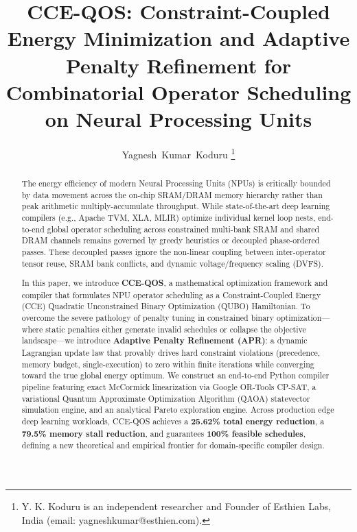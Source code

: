 \documentclass[journal]{IEEEtran}
\theoremstyle{definition}
\begin{document}
\title{CCE-QOS: Constraint-Coupled Energy Minimization and Adaptive Penalty Refinement for Combinatorial Operator Scheduling on Neural Processing Units}

\author{Yagnesh~Kumar~Koduru%
\thanks{Y. K. Koduru is an independent researcher and Founder of Esthien Labs, India (email: yagneshkumar@esthien.com).}}

\maketitle

\begin{abstract}
The energy efficiency of modern Neural Processing Units (NPUs) is critically bounded by data movement across the on-chip SRAM/DRAM memory hierarchy rather than peak arithmetic multiply-accumulate throughput. While state-of-the-art deep learning compilers (e.g., Apache TVM, XLA, MLIR) optimize individual kernel loop nests, end-to-end global operator scheduling across constrained multi-bank SRAM and shared DRAM channels remains governed by greedy heuristics or decoupled phase-ordered passes. These decoupled passes ignore the non-linear coupling between inter-operator tensor reuse, SRAM bank conflicts, and dynamic voltage/frequency scaling (DVFS).

In this paper, we introduce \textbf{CCE-QOS}, a mathematical optimization framework and compiler that formulates NPU operator scheduling as a Constraint-Coupled Energy (CCE) Quadratic Unconstrained Binary Optimization (QUBO) Hamiltonian. To overcome the severe pathology of penalty tuning in constrained binary optimization—where static penalties either generate invalid schedules or collapse the objective landscape—we introduce \textbf{Adaptive Penalty Refinement (APR)}: a dynamic Lagrangian update law that provably drives hard constraint violations (precedence, memory budget, single-execution) to zero within finite iterations while converging toward the true global energy optimum. 
We construct an end-to-end Python compiler pipeline featuring exact McCormick linearization via Google OR-Tools CP-SAT, a variational Quantum Approximate Optimization Algorithm (QAOA) statevector simulation engine, and an analytical Pareto exploration engine. Across production edge deep learning workloads, CCE-QOS achieves a \textbf{25.62\% total energy reduction}, a \textbf{79.5\% memory stall reduction}, and guarantees \textbf{100\% feasible schedules}, defining a new theoretical and empirical frontier for domain-specific compiler design.
\end{abstract}
\end{document}
